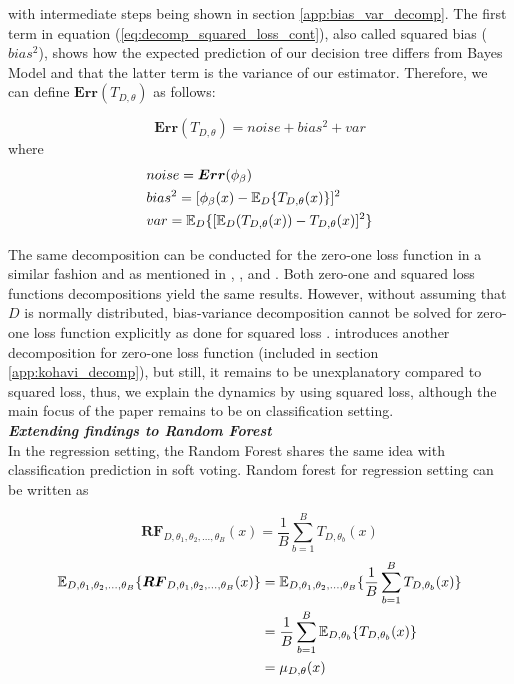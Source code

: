 with intermediate steps being shown in section \ref{app:bias_var_decomp}.
The first term in equation (\ref{eq:decomp_squared_loss_cont}), also called squared bias ($bias^2$),
shows how the expected prediction of our decision tree differs from Bayes Model 
and that the latter term is the variance of our estimator. 
Therefore, we can define $\boldsymbol{Err}(T_{D,\theta})$ as follows:

\begin{equation}
\boldsymbol{Err}(T_{D,\theta}) = noise + bias^2 + var
\end{equation}
\vspace{-3mm}
\qquad \qquad \qquad \quad where
\vspace{-6.3mm}
\begin{align}
& noise = \boldsymbol{Err}(\phi_{\beta}) \notag \\
& bias^2 = [\phi_{\beta}(x) - \mathbb{E}_{D}\{T_{D,\theta}(x)\}]^2 \notag \\
& var = \mathbb{E}_{D}\{[\mathbb{E}_{D}(T_{D,\theta}(x)) - T_{D,\theta}(x)]^2\} \notag
\end{align}

The same decomposition can be conducted for the zero-one loss function in a similar fashion and as mentioned in 
\cite{louppe2014understanding}, \cite{domingos2000decomposition}, 
\cite{james2003variance} and \cite{friedman1997zeroLoss}.
Both zero-one and squared loss functions decompositions yield the same results. 
However, without assuming that $D$ is normally distributed, bias-variance decomposition 
cannot be solved for zero-one loss function explicitly as done for squared loss \cite{louppe2014understanding}. 
\cite{kohavi1996bias} introduces another decomposition for zero-one loss function (included in section \ref{app:kohavi_decomp}), 
but still, it remains to be unexplanatory compared to squared loss, thus, 
we explain the dynamics by using squared loss, although the main focus of the paper remains to be on classification setting.
\vspace{2mm}
\\
\textbf{\emph{Extending findings to Random Forest }}\\
In the regression setting, the Random Forest shares the same idea with classification prediction in soft voting. 
Random forest for regression setting can be written as

\begin{equation}
\boldsymbol{RF}_{D, \theta_{1},\theta_{2},..., \theta_{B}}(x) = \dfrac{1}{B}\sum_{b = 1}^{B}T_{D,\theta_{b}}(x)
\end{equation}
\begin{align}\label{eq:mu}
\mathbb{E}_{D, \theta_{1}, \theta_{2},..., \theta_{B}}\{\boldsymbol{RF}_{D, \theta_{1},\theta_{2},..., \theta_{B}}(x) \} 
	& = \mathbb{E}_{D, \theta_{1}, \theta_{2},..., \theta_{B}}\{\dfrac{1}{B}\sum_{b = 1}^{B}T_{D,\theta_{b}}(x)\} \notag \\
	& = \dfrac{1}{B}\sum_{b=1}^{B}\mathbb{E}_{D,\theta_{b}}\{T_{D, \theta_{b}}(x)\}\notag \\
	& = \mu_{D,\theta}(x)
\end{align}

